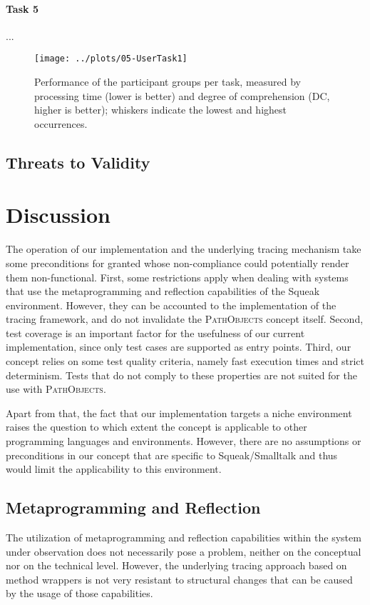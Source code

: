 \paragraph{Task 5} ...

\begin{figure}[tb]
	\centering

	\texttt{[image: ../plots/05-UserTask1]}
	\caption[Results of the User Study]{Performance of the participant groups per task, measured by processing time (lower is better) and degree of comprehension (DC, higher is better); whiskers indicate the lowest and highest occurrences.}
	\label{fig:DiscussionStudyResults}
	
\end{figure}

\subsection{Threats to Validity}

\clearpage
\section{Discussion}
\label{s:DiscussionLimitations}
The operation of our implementation and the underlying tracing mechanism take some preconditions for granted whose non-compliance could potentially render them non-functional.
First, some restrictions apply when dealing with systems that use the metaprogramming and reflection capabilities of the Squeak environment.
However, they can be accounted to the implementation of the tracing framework, and do not invalidate the \textsc{PathObjects} concept itself.
Second, test coverage is an important factor for the usefulness of our current implementation, since only test cases are supported as entry points. 
Third, our concept relies on some test quality criteria, namely fast execution times and strict determinism.
Tests that do not comply to these properties are not suited for the use with \textsc{PathObjects}.

Apart from that, the fact that our implementation targets a niche environment raises the question to which extent the concept is applicable to other programming languages and environments.
However, there are no assumptions or preconditions in our concept that are specific to  Squeak/Smalltalk and thus would limit the applicability to this environment.

\subsection{Metaprogramming and Reflection}
\label{ss:DiscussionLimitationsMeta}
The utilization of metaprogramming and reflection capabilities within the system under observation does not necessarily pose a problem, neither on the conceptual nor on the technical level.
However, the underlying tracing approach based on method wrappers is not very resistant to structural changes that can be caused by the usage of those capabilities.

